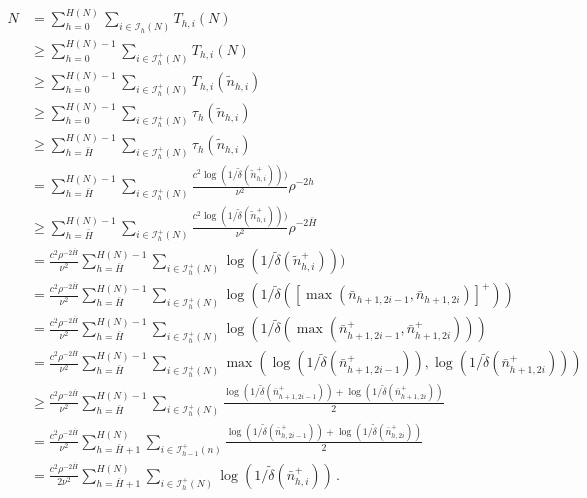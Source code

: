 \begingroup
\allowdisplaybreaks
\begin{align}
    N & = \sum_{h=0}^{H(N)}\sum_{i\in\mathcal{I}_h(N)} T_{h,i}(N) \nonumber \\
      &\geq \sum_{h=0}^{H(N)-1}\sum_{i\in\mathcal{I}_h^+(N)} T_{h,i}(N) \nonumber \\
      & \geq \sum_{h=0}^{H(N)-1}\sum_{i\in\mathcal{I}_h^+(N)} T_{h,i}(\tilde{n}_{h,i}) \label{eq:gpo.decomp1} \\
      & \geq \sum_{h=0}^{H(N)-1}\sum_{i\in\mathcal{I}_h^+(N)} \tau_h(\tilde{n}_{h,i}) \nonumber \\
      & \geq \sum_{h=\bar{H}}^{H(N)-1}\sum_{i\in\mathcal{I}_h^+(N)} \tau_h(\tilde{n}_{h,i}) \nonumber \\
      & = \sum_{h=\bar{H}}^{H(N)-1}\sum_{i\in\mathcal{I}_h^+(N)} \frac{c^2\log(1/\tilde{\delta}(\tilde{n}_{h,i}^+)))}{\nu^2}\rho^{-2h} \nonumber \\
       & \geq \sum_{h=\bar{H}}^{H(N)-1}\sum_{i\in\mathcal{I}_h^+(N)} \frac{c^2\log(1/\tilde{\delta}(\tilde{n}_{h,i}^+)))}{\nu^2}\rho^{-2\bar{H}} \nonumber \\
      & = \frac{c^2\rho^{-2\bar{H}}}{\nu^2} \sum_{h=\bar{H}}^{H(N)-1}\sum_{i\in\mathcal{I}_h^+(N)} \log(1/\tilde{\delta}(\tilde{n}_{h,i}^+))) \nonumber \\
      & = \frac{c^2\rho^{-2\bar{H}}}{\nu^2} \sum_{h=\bar{H}}^{H(N)-1}\sum_{i\in\mathcal{I}_h^+(N)} \log(1/\tilde{\delta}(\left[\max(\bar{n}_{h+1,2i-1},\bar{n}_{h+1,2i})\right]^+)) \label{eq:gpo.decomp2} \\
      & = \frac{c^2\rho^{-2\bar{H}}}{\nu^2} \sum_{h=\bar{H}}^{H(N)-1}\sum_{i\in\mathcal{I}_h^+(N)} \log(1/\tilde{\delta}(\max(\bar{n}_{h+1,2i-1}^+,\bar{n}_{h+1,2i}^+))) \label{eq:gpo.decomp3} \\
      & = \frac{c^2\rho^{-2\bar{H}}}{\nu^2} \sum_{h=\bar{H}}^{H(N)-1}\sum_{i\in\mathcal{I}_h^+(N)} \max(\log(1/\tilde{\delta}(\bar{n}_{h+1,2i-1}^+)),\log(1/\tilde{\delta}(\bar{n}_{h+1,2i}^+))) \nonumber \\
      & \geq \frac{c^2\rho^{-2\bar{H}}}{\nu^2} \sum_{h=\bar{H}}^{H(N)-1}\sum_{i\in\mathcal{I}_h^+(N)} \frac{\log(1/\tilde{\delta}(\bar{n}_{h+1,2i-1}^+))+\log(1/\tilde{\delta}(\bar{n}_{h+1,2i}^+))}{2} \nonumber \\
      & = \frac{c^2\rho^{-2\bar{H}}}{\nu^2} \sum_{h=\bar{H}+1}^{H(N)}\sum_{i\in\mathcal{I}_{h-1}^+(n)} \frac{\log(1/\tilde{\delta}(\bar{n}_{h,2i-1}^+))+\log(1/\tilde{\delta}(\bar{n}_{h,2i}^+))}{2} \label{eq:gpo.decomp4} \\
      & = \frac{c^2\rho^{-2\bar{H}}}{2\nu^2} \sum_{h=\bar{H}+1}^{H(N)}\sum_{i\in\mathcal{I}_h^+(N)} \log(1/\tilde{\delta}(\bar{n}_{h,i}^+)) \nonumber \,.
\end{align}
